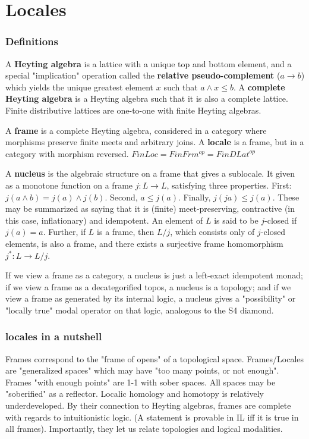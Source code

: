 \documentclass{beamer}
\begin{document}
\section{Locales}
\begin{frame}
\frametitle{Definitions}
A \textbf{Heyting algebra} is a lattice with a unique top and bottom element, and a special "implication" operation called the \textbf{relative pseudo-complement} (\(a \rightarrow b\)) which yields the unique greatest element \(x\) such that \(a \wedge x \le b\). A \textbf{complete Heyting algebra} is a Heyting algebra such that it is also a complete lattice. Finite distributive lattices are one-to-one with finite Heyting algebras.

A \textbf{frame} is a complete Heyting algebra, considered in a category where morphisms preserve finite meets and arbitrary joins. A \textbf{locale} is a frame, but in a category with morphism reversed. \(FinLoc = FinFrm^{op} = FinDLat^{op}\)
\end{frame}

\begin{frame}
A \textbf{nucleus} is the algebraic structure on a frame that gives a sublocale. It given as a monotone function on a frame \(j : L \rightarrow L\), satisfying three properties. First: \(j(a \wedge b) = j(a) \wedge j(b)\). Second, \(a \le j(a)\). Finally, \(j(ja) \le j(a)\). These may be summarized as saying that it is (finite) meet-preserving, contractive (in this case, inflationary) and idempotent. An element of \(L\) is said to be \(j\)-closed if \(j(a)=a\). Further, if \(L\) is a frame, then \(L/j\), which consists only of \(j\)-closed elements, is also a frame, and there exists a surjective frame homomorphism \(j^* : L \rightarrow L/j\). 

If we view a frame as a category, a nucleus is just a left-exact idempotent monad; if we view a frame as a decategorified topos, a nucleus is a topology; and if we view a frame as generated by its internal logic, a nucleus gives a "possibility" or "locally true" modal operator on that logic, analogous to the S4 diamond.
\end{frame}


\begin{frame}
\frametitle{locales in a nutshell}
Frames correspond to the "frame of opens" of a topological space. Frames/Locales are "generalized spaces" which may have "too many points, or not enough". Frames "with enough points" are 1-1 with sober spaces. All spaces may be "soberified" as a reflector.  Localic homology and homotopy is relatively underdeveloped. By their connection to Heyting algebras, frames are complete with regards to intuitionistic logic. (A statement is provable in IL iff it is true in all frames). Importantly, they let us relate topologies and logical modalities.
\end{frame}
\end{document}

